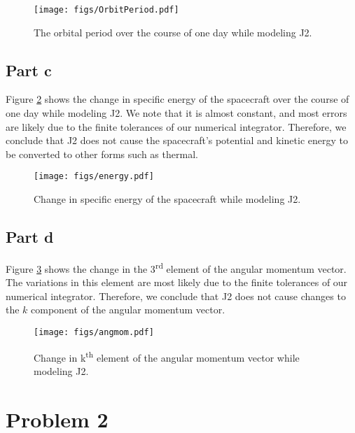 \documentclass[11pt]{article}
\begin{document}
\begin{figure}[h!]
	\centering
	\texttt{[image: figs/OrbitPeriod.pdf]}
	\caption{The orbital period over the course of one day while modeling J2.}
	\label{fig:OrbitPeriod}
\end{figure}

\subsection{Part c}

Figure \ref{fig:energy} shows the change in specific energy of the spacecraft over the course of one day while modeling J2. We note that it is almost constant, and most errors are likely due to the finite tolerances of our numerical integrator. Therefore, we conclude that J2 does not cause the spacecraft's potential and kinetic energy to be converted to other forms such as thermal. \\

\begin{figure}[h!]
	\centering
	\texttt{[image: figs/energy.pdf]}
	\caption{Change in specific energy of the spacecraft while modeling J2.}
	\label{fig:energy}
\end{figure}

\subsection{Part d}

Figure \ref{fig:angmom} shows the change in the 3\textsuperscript{rd} element of the angular momentum vector. The variations in this element are most likely due to the finite tolerances of our numerical integrator. Therefore, we conclude that J2 does not cause changes to the $k$ component of the angular momentum vector. \\

\begin{figure}[h!]
	\centering
	\texttt{[image: figs/angmom.pdf]}
	\caption{Change in k\textsuperscript{th} element of the angular momentum vector while modeling J2.}
	\label{fig:angmom}
\end{figure}

\section{Problem 2}
\end{document}
